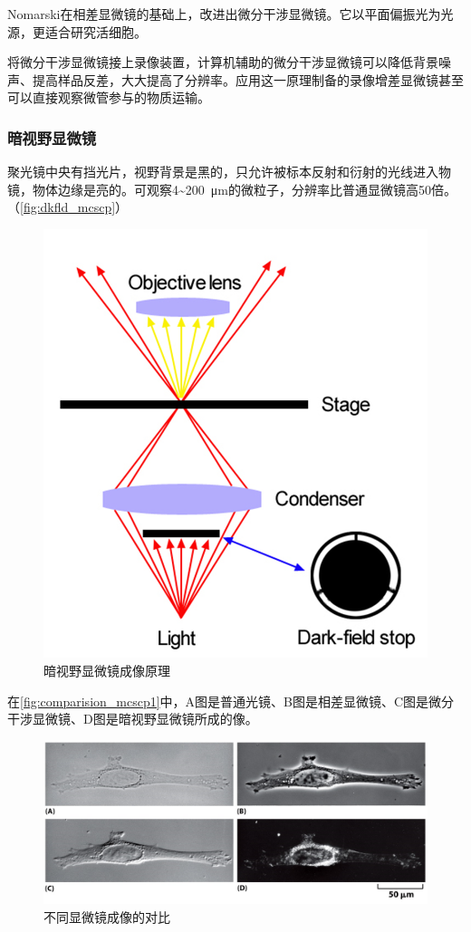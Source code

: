 Nomarski在相差显微镜的基础上，改进出微分干涉显微镜。它以平面偏振光为光源，更适合研究活细胞。

将微分干涉显微镜接上录像装置，计算机辅助的微分干涉显微镜可以降低背景噪声、提高样品反差，大大提高了分辨率。应用这一原理制备的录像增差显微镜甚至可以直接观察微管参与的物质运输。

\subsubsection{暗视野显微镜}

聚光镜中央有挡光片，视野背景是黑的，只允许被标本反射和衍射的光线进入物镜，物体边缘是亮的。可观察4\textasciitilde\SI{200}{\um}的微粒子，分辨率比普通显微镜高50倍。（\autoref{fig:dkfld_mcscp}）

\begin{figure}[htbp]
	\centering
	\includegraphics[width=0.4\linewidth]{Pics/暗视野显微镜}
	\caption{暗视野显微镜成像原理}
	\label{fig:dkfld_mcscp}
\end{figure}

在\autoref{fig:comparision_mcscp1}中，A图是普通光镜、B图是相差显微镜、C图是微分干涉显微镜、D图是暗视野显微镜所成的像。

\begin{figure}[htbp]
	\centering
	\includegraphics[width=0.8\linewidth]{Pics/显微镜成像对比}
	\caption{不同显微镜成像的对比}
	\label{fig:comparision_mcscp1}
\end{figure}

